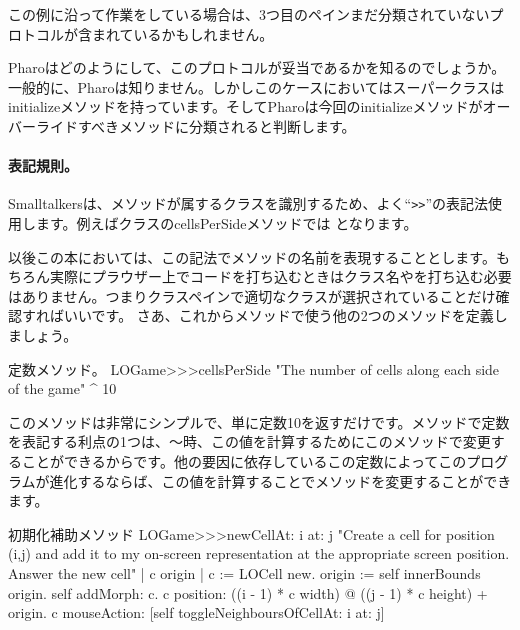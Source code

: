 \documentclass[a4paper,10pt,twoside]{book}
\begin{document}
この例に沿って作業をしている場合は、3つ目のペインまだ分類されていないプロトコルが含まれているかもしれません。

Pharoはどのようにして、このプロトコルが妥当であるかを知るのでしょうか。一般的に、Pharoは知りません。しかしこのケースにおいてはスーパークラスはinitializeメソッドを持っています。そしてPharoは今回のinitializeメソッドがオーバーライドすべきメソッドに分類されると判断します。


\paragraph{表記規則。} Smalltalkersは、メソッドが属するクラスを識別するため、よく``\verb|>>|''の表記法使用します。例えばクラスのcellsPerSideメソッドでは となります。

以後この本においては、この記法でメソッドの名前を表現することとします。もちろん実際にプラウザー上でコードを打ち込むときはクラス名や\ct{>>>}を打ち込む必要はありません。つまりクラスペインで適切なクラスが選択されていることだけ確認すればいいです。
さあ、これからメソッドで使う他の2つのメソッドを定義しましょう。

\begin{method}[sbegamecellsperside]{定数メソッド。}
LOGame>>>cellsPerSide
   "The number of cells along each side of the game"
   ^ 10
\end{method}

このメソッドは非常にシンプルで、単に定数10を返すだけです。メソッドで定数を表記する利点の1つは、～時、この値を計算するためにこのメソッドで変更することができるからです。他の要因に依存しているこの定数によってこのプログラムが進化するならば、この値を計算することでメソッドを変更することができます。

\begin{method}[newCellAt:at:]{初期化補助メソッド}
LOGame>>>newCellAt: i at: j
   "Create a cell for position (i,j) and add it to my on-screen
   representation at the appropriate screen position.  Answer the new cell"
   | c origin |
   c := LOCell new.
   origin := self innerBounds origin.
   self addMorph: c.
   c position: ((i - 1) * c width) @ ((j - 1) * c height) + origin.
   c mouseAction: [self toggleNeighboursOfCellAt: i at: j]
\end{method}
\end{document}
